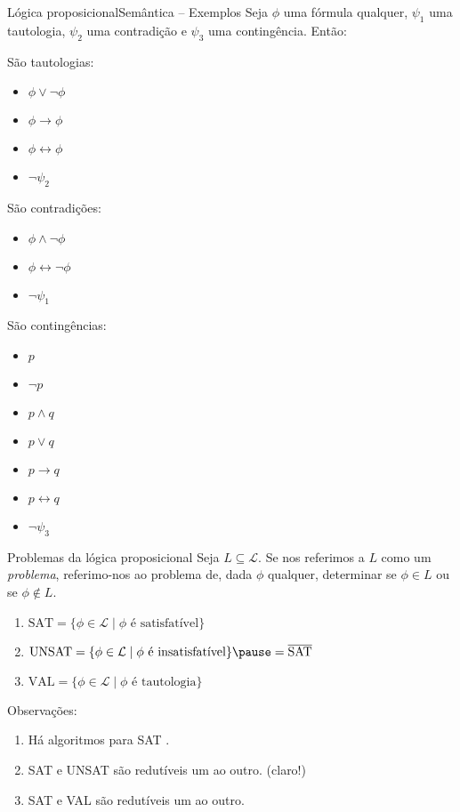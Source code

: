 \begin{frame}{Lógica proposicional}{Semântica -- Exemplos}
	Seja $\phi$ uma fórmula qualquer, $\psi_1$ uma tautologia, $\psi_2$ uma contradição e $\psi_3$ uma contingência. Então:
	\begin{multicols}{2}
	\pause São tautologias:
	\begin{itemize}
		\pause\item $\phi \vee \neg \phi$
		\pause\item $\phi \rightarrow \phi$
		\pause\item $\phi \leftrightarrow \phi$
		\pause\item $\neg \psi_2$
	\end{itemize}
	\pause São contradições:
	\begin{itemize}
		\pause\item $\phi \wedge \neg \phi$
		\pause\item $\phi \leftrightarrow \neg \phi$
		\pause\item $\neg \psi_1$
	\end{itemize}
	\pause São contingências:
	\begin{itemize}
		\pause\item $p$
		\pause\item $\neg p$
		\pause\item $p \wedge q$
		\pause\item $p \vee q$
		\pause\item $p \rightarrow q$
		\pause\item $p \leftrightarrow q$
		\pause\item $\neg \psi_3$
	\end{itemize}
\end{multicols}
\end{frame}

\begin{frame}{Problemas da lógica proposicional}
	Seja $L \subseteq \mathcal{L}$. Se nos referimos a $L$ como um \emph{problema}, referimo-nos ao problema de, dada $\phi$ qualquer, determinar se $\phi \in L$ ou se $\phi \notin L$.
	\vspace{-.3cm}
	\begin{enumerate}
		\pause\item $\text{SAT} = \{\phi \in \mathcal{L} \mid \phi \text{ é satisfatível} \}$
		\pause\item $\text{UNSAT} = \{\phi \in \mathcal{L} \mid \phi \text{ é insatisfatível} \}\pause = \overline{\text{SAT}}$
		\pause\item $\text{VAL} = \{\phi \in \mathcal{L} \mid \phi \text{ é tautologia} \}$
	\end{enumerate}
	
	\vspace{.2cm}
	\pause Observações:
	\begin{enumerate}
		\pause\item Há algoritmos para SAT \cite{davis1960computing,davis1962machine,biere2009conflict}.
		\pause\item SAT e UNSAT são redutíveis um ao outro. \pause (claro!)
		\pause\item SAT e VAL são redutíveis um ao outro.
	\end{enumerate}
\end{frame}


